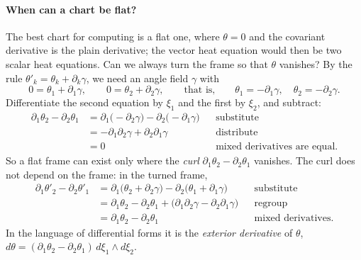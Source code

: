 \paragraph{When can a chart be flat?} The best chart for computing is a flat one, where $\theta = 0$ and the covariant derivative is the plain derivative; the vector heat equation would then be two scalar heat equations. Can we always turn the frame so that $\theta$ vanishes? By the rule $\theta'_k = \theta_k + \partial_k\gamma$, we need an angle field $\gamma$ with
\begin{equation*}
0 = \theta_1 + \partial_1\gamma, \qquad 0 = \theta_2 + \partial_2\gamma, \qquad\text{that is,}\qquad \theta_1 = -\partial_1\gamma, \quad \theta_2 = -\partial_2\gamma .
\end{equation*}
Differentiate the second equation by $\xi_1$ and the first by $\xi_2$, and subtract:
\begin{align*}
\partial_1\theta_2 - \partial_2\theta_1 &= \partial_1\big(-\partial_2\gamma\big) - \partial_2\big(-\partial_1\gamma\big) && \text{substitute} \\
&= -\partial_1\partial_2\gamma + \partial_2\partial_1\gamma && \text{distribute} \\
&= 0 && \text{mixed derivatives are equal.}
\end{align*}
So a flat frame can exist only where the \emph{curl} $\partial_1\theta_2 - \partial_2\theta_1$ vanishes. The curl does not depend on the frame: in the turned frame,
\begin{align*}
\partial_1\theta'_2 - \partial_2\theta'_1 &= \partial_1\big(\theta_2 + \partial_2\gamma\big) - \partial_2\big(\theta_1 + \partial_1\gamma\big) && \text{substitute} \\
&= \partial_1\theta_2 - \partial_2\theta_1 + \big(\partial_1\partial_2\gamma - \partial_2\partial_1\gamma\big) && \text{regroup} \\
&= \partial_1\theta_2 - \partial_2\theta_1 && \text{mixed derivatives.}
\end{align*}
In the language of differential forms it is the \emph{exterior derivative} of $\theta$, $d\theta = (\partial_1\theta_2 - \partial_2\theta_1)\, d\xi_1\wedge d\xi_2$.

